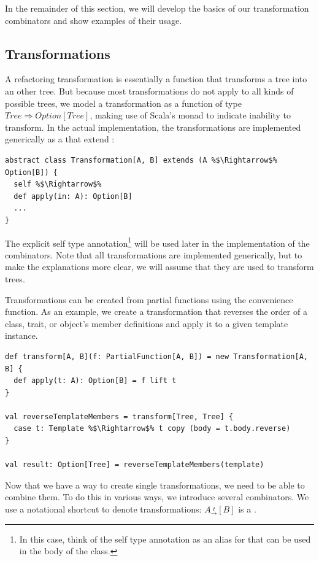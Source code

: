 \documentclass[10pt,a4paper,oneside]{scrreprt}
\begin{document}
In the remainder of this section, we will develop the basics of our transformation combinators and show examples of their usage.

\subsection{Transformations}

A refactoring transformation is essentially a function that transforms a tree into an other tree. But because most transformations do not apply to all kinds of possible trees, we model a transformation as a function of type $Tree\Rightarrow Option[Tree]$, making use of Scala's  monad to indicate inability to transform. In the actual implementation, the transformations are implemented generically as a  that extend :

\begin{lstlisting}
abstract class Transformation[A, B] extends (A %$\Rightarrow$% Option[B]) {
  self %$\Rightarrow$%
  def apply(in: A): Option[B]
  ...
}
\end{lstlisting}

The explicit self type annotation\footnote{In this case, think of the self type annotation as an alias for  that can be used in the body of the class.} will be used later in the implementation of the combinators. Note that all transformations are implemented generically, but to make the explanations more clear, we will assume that they are used to transform trees.

Transformations can be created from partial functions using the  convenience function. As an example, we create a transformation that reverses the order of a class, trait, or object's member definitions and apply it to a given template instance.

\begin{lstlisting}
def transform[A, B](f: PartialFunction[A, B]) = new Transformation[A, B] {
  def apply(t: A): Option[B] = f lift t
}

val reverseTemplateMembers = transform[Tree, Tree] {
  case t: Template %$\Rightarrow$% t copy (body = t.body.reverse)
}

val result: Option[Tree] = reverseTemplateMembers(template)
\end{lstlisting}

Now that we have a way to create single transformations, we need to be able to combine them. To do this in various ways, we introduce several combinators. We use a notational shortcut to denote transformations: $A \overset{t}{_\rightarrow} [B]$ is a .
\end{document}
